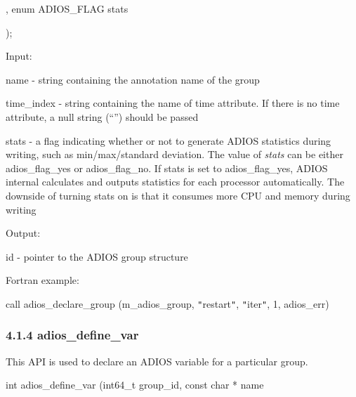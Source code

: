 \vspace{10pt}
\parindent=345pt
, enum ADIOS\_FLAG stats

\vspace{10pt}
\parindent=172pt
);

\vspace{10pt}
\leftskip=22pt
\parindent=0pt
Input: 

\vspace{10pt}
\leftskip=36pt
name - string containing the annotation name of the group 

\vspace{10pt}
time\_index - string containing the name of time attribute. If there is no time 
attribute, a null string (``'') should be passed

\vspace{10pt}
stats - a flag indicating whether or not to generate ADIOS statistics during writing, 
such as min/max/standard deviation. The value of \textit{stats} can be either adios\_flag\_yes{\Large  
}or adios\_flag\_no. If stats is set to adios\_flag\_yes, ADIOS internal calculates 
and outputs statistics for each processor automatically. The downside of turning 
stats on is that it consumes more CPU and memory during writing

\vspace{10pt}
\leftskip=22pt
Output: 

\vspace{10pt}
\leftskip=36pt
id - pointer to the ADIOS group structure

\vspace{22pt}
\leftskip=22pt
Fortran example: 

\vspace{10pt}
\parindent=13pt
call adios\_declare\_group (m\_adios\_group, \texttt{"}restart\texttt{"}, \texttt{"}iter\texttt{"}, 
1, adios\_err)\label{HToc182553359}

\vspace{10pt}
\subsubsection*{{\large \textbf{4.1.4 adios\_define\_var}}}

\vspace{10pt}
\leftskip=0pt
\parindent=0pt
This API is used to declare an ADIOS variable for a particular group. 

\vspace{10pt}
\leftskip=22pt
int adios\_define\_var (int64\_t group\_id, const char * name

